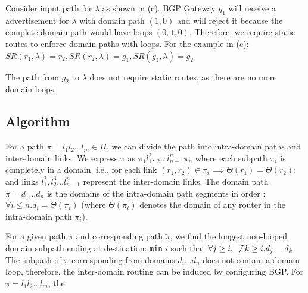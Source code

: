  \label{sec:static}
Consider input path for $\lambda$ 
as shown in (c). BGP Gateway $g_1$ 
will receive a advertisement for $\lambda$ with domain
path $(1,0)$ and will reject it because the complete
domain path would have loops $(0,1,0)$. 
Therefore, we require static routes 
to enforce domain paths with loops. For the example in 
(c): \\
\hspace*{0.7cm}$SR(r_1,\lambda) = r_2, SR(r_2,\lambda) = g_1, SR(g_1,\lambda) = g_2$ 

\noindent The path from $g_2$ to $\lambda$ does not 
require static routes, as there are no more domain loops.

\subsection{Algorithm}
For a path $\pi = l_1 l_2 \ldots l_m \in \Pi$, we
can divide the path into intra-domain paths and inter-domain
links. We express $\pi$ as 
$\pi_1 l_1^2 \pi_2 \ldots l_{n-1}^n \pi_n$ where
each subpath $\pi_i$ is completely in a
domain, i.e., for each 
link $(r_1,r_2) \in \pi_i \implies \Theta(r_1) = \Theta(r_2)$;
and links $l_1^2, l_2^3 \ldots l_{n-1}^n$ 
represent the inter-domain links. The domain path
$\tilde{\pi} = d_1 \ldots d_n$ is the 
domains of the intra-domain path segments in order
: $\forall i \leq n. d_i = \Theta(\pi_i)$ (where
$\Theta(\pi_i)$ denotes the domain of any router in the 
intra-domain path $\pi_i$). 


For a given path $\pi$ and corresponding path $\tilde{\pi}$,
we find the longest non-looped domain subpath ending at
destination: \texttt{min} $i$ such that
$\forall j \geq i. ~\not\exists k \geq i. d_j = d_k$. 
The subpath of $\pi$ 
corresponding from domains $d_i \ldots d_n$ does
not contain a domain loop, therefore, the inter-domain
routing can be induced by configuring BGP. 
For $\pi = l_1 l_2 \ldots l_m$, the 


 



